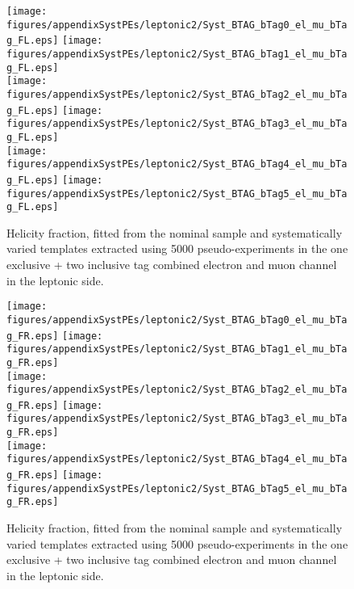 \begin{figure}[!hb]
\begin{center}
        \texttt{[image: figures/appendixSystPEs/leptonic2/Syst\_BTAG\_bTag0\_el\_mu\_bTag\_FL.eps]}
        \texttt{[image: figures/appendixSystPEs/leptonic2/Syst\_BTAG\_bTag1\_el\_mu\_bTag\_FL.eps]}\\
        \texttt{[image: figures/appendixSystPEs/leptonic2/Syst\_BTAG\_bTag2\_el\_mu\_bTag\_FL.eps]}
        \texttt{[image: figures/appendixSystPEs/leptonic2/Syst\_BTAG\_bTag3\_el\_mu\_bTag\_FL.eps]}\\
        \texttt{[image: figures/appendixSystPEs/leptonic2/Syst\_BTAG\_bTag4\_el\_mu\_bTag\_FL.eps]}
        \texttt{[image: figures/appendixSystPEs/leptonic2/Syst\_BTAG\_bTag5\_el\_mu\_bTag\_FL.eps]}
        
\caption{Helicity fraction, \fl fitted from the nominal \ttbar sample and systematically varied templates extracted using 5000 pseudo-experiments in the one exclusive + two inclusive \bt tag combined electron and muon channel in the leptonic side. }
\label{fig:systematicVar_lep_fL_elmu2incl_btag1}
\end{center}
\end{figure}

\begin{figure}[!hb]
\begin{center}
        \texttt{[image: figures/appendixSystPEs/leptonic2/Syst\_BTAG\_bTag0\_el\_mu\_bTag\_FR.eps]}
        \texttt{[image: figures/appendixSystPEs/leptonic2/Syst\_BTAG\_bTag1\_el\_mu\_bTag\_FR.eps]}\\
        \texttt{[image: figures/appendixSystPEs/leptonic2/Syst\_BTAG\_bTag2\_el\_mu\_bTag\_FR.eps]}
        \texttt{[image: figures/appendixSystPEs/leptonic2/Syst\_BTAG\_bTag3\_el\_mu\_bTag\_FR.eps]}\\
        \texttt{[image: figures/appendixSystPEs/leptonic2/Syst\_BTAG\_bTag4\_el\_mu\_bTag\_FR.eps]}
        \texttt{[image: figures/appendixSystPEs/leptonic2/Syst\_BTAG\_bTag5\_el\_mu\_bTag\_FR.eps]}
        
\caption{Helicity fraction, \fr fitted from the nominal \ttbar sample and systematically varied templates extracted using 5000 pseudo-experiments in the one exclusive + two inclusive \bt tag combined electron and muon channel in the leptonic side. }
\label{fig:systematicVar_lep_fR_elmu2incl_btag1}
\end{center}
\end{figure}

